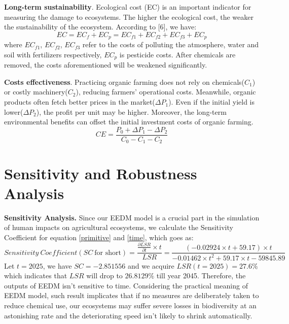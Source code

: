 \documentclass[12pt]{article}
\begin{document}
\textbf{Long-term sustainability}. Ecological cost (EC) is an important indicator for measuring the damage to ecosystems. The higher the ecological cost, the weaker the sustainability of the ecosystem. According to [6], we have:
\begin{equation}
    EC=EC_f+EC_p=EC_{f1}+EC_{f2}+EC_{f3}+EC_p
\end{equation}
where $EC_{f1}$, $EC_{f2}$, $EC_{f3}$ refer to the costs of polluting the atmosphere, water and soil with fertilizers respectively, $EC_p$ is pesticide costs. After chemicals are removed, the costs aforementioned will be weakened significantly.

\textbf{Costs effectiveness}. Practicing organic farming does not rely on chemicals($C_1$) or costly machinery($C_2$), reducing farmers' operational costs. Meanwhile, organic products often fetch better prices in the market($\Delta P_1$). Even if the initial yield is lower($\Delta P_2$), the profit per unit may be higher. Moreover, the long-term environmental benefits can offset the initial investment costs of organic farming.
\begin{equation}
    CE=\frac{P_0+\Delta P_1-\Delta P_2}{C_0-C_1-C_2}
\end{equation}















\section{Sensitivity and Robustness Analysis}
\hspace{2em}\textbf{Sensitivity Analysis. }Since our EEDM model is a crucial part in the simulation of human impacts on agricultural ecosystems, we calculate the Sensitivity Coefficient for equation \eqref{primitive} and \eqref{time}, which goes as:
\begin{equation}
	Sensitivity\ Coefficient(SC\  \text{for short})=\frac{\frac{\partial LSR}{\partial t}\times t}{LSR}=\frac{(-0.02924\times t+59.17)\times t}{-0.01462\times t^2+59.17\times t-59845.89}
\end{equation}
Let $t=2025$, we have $SC=-2.851556$ and we acquire $LSR(t=2025)=27.6\%$ which indicates that $LSR$ will drop to $26.8129\%$ till year 2045. Therefore, the outputs of EEDM isn't sensitive to time. Considering the practical meaning of EEDM model, such result implicates that if no measures are deliberately taken to reduce chemical use, our ecosystems may suffer severe losses in biodiversity at an astonishing rate and the deteriorating speed isn't likely to shrink automatically.
\end{document}
